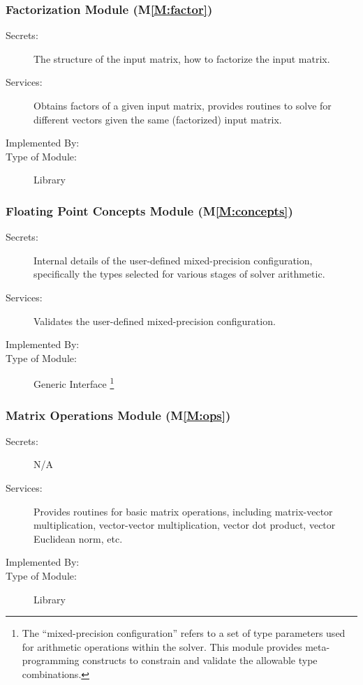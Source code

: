 \documentclass[12pt, titlepage]{article}
\newcommand{\mref}[1]{M\ref{#1}}
\begin{document}
\subsubsection{Factorization Module (\mref{M:factor})}

\begin{description}
\item[Secrets:] The structure of the input matrix, how to factorize the input
  matrix.
\item[Services:] Obtains factors of a given input matrix, provides routines to
  solve for different vectors given the same (factorized) input matrix.
\item[Implemented By:] \progname{}
\item[Type of Module:] Library
\end{description}

\subsubsection{Floating Point Concepts Module (\mref{M:concepts})}

\begin{description}
\item[Secrets:] Internal details of the user-defined mixed-precision configuration,
  specifically the types selected for various stages of solver arithmetic.
\item[Services:] Validates the user-defined mixed-precision configuration.
\item[Implemented By:] \progname{}
\item[Type of Module:] Generic Interface \footnote{The ``mixed-precision configuration''
    refers to a set of type parameters used for arithmetic operations within the
    solver. This module provides meta-programming constructs to constrain and
    validate the allowable type combinations.}
\end{description}

\subsubsection{Matrix Operations Module (\mref{M:ops})}

\begin{description}
\item[Secrets:] N/A
\item[Services:] Provides routines for basic matrix operations, including
  matrix-vector multiplication, vector-vector multiplication, vector dot
  product, vector Euclidean norm, etc.
\item[Implemented By:] \progname{}
\item[Type of Module:] Library
\end{description}
\end{document}
